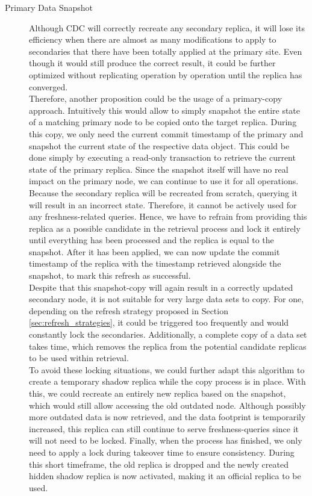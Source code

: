 \begin{description}
    \item [Primary Data Snapshot]
    Although CDC will correctly recreate any secondary replica, it will lose its efficiency when there are almost as many modifications to apply to secondaries that there 
    have been totally applied at the primary site. Even though it would still produce the correct result, it could be further optimized without replicating operation by operation 
    until the replica has converged.\\
    Therefore, another proposition could be the usage of a primary-copy approach. 
    Intuitively this would allow to simply snapshot the entire state of a matching primary node to be copied onto the target replica.
    During this copy, we only need the current commit timestamp of the primary and snapshot the current state of the respective data object. 
    This could be done simply by executing a read-only transaction to retrieve the current state of the primary replica.
    Since the snapshot itself will have no real impact on the primary node, we can continue to use it for all operations.
    Because the secondary replica will be recreated from scratch, querying it will result in an incorrect state. 
    Therefore, it cannot be actively used for any freshness-related queries.
    Hence, we have to refrain from providing this replica as a possible candidate in the retrieval process and lock it entirely 
    until everything has been processed and the replica is equal to the snapshot. After it has been applied, we can now update the commit timestamp of the replica
    with the timestamp retrieved alongside the snapshot, to mark this refresh as successful.\\
    Despite that this snapshot-copy will again result in a correctly updated secondary node, it is not suitable for very large data sets to copy.  
    For one, depending on the refresh strategy proposed in Section \ref{sec:refresh_strategies}, it could be triggered too frequently and would constantly lock the 
    secondaries. Additionally, a complete copy of a data set takes time, which removes the replica from the potential candidate replicas to be used within retrieval.\\
    To avoid these locking situations, we could further adapt this algorithm to create a temporary shadow replica while the copy process is in place.
    With this, we could recreate an entirely new replica based on the snapshot, which would still allow accessing the old outdated node.
    Although possibly more outdated data is now retrieved, and the data footprint is temporarily increased, this replica can still continue to serve freshness-queries 
    since it will not need to be locked.
    Finally, when the process has finished, we only need to apply a lock during takeover time to ensure consistency. During this short timeframe, the old replica is dropped
    and the newly created hidden shadow replica is now activated, making it an official replica to be used.




\end{description}
